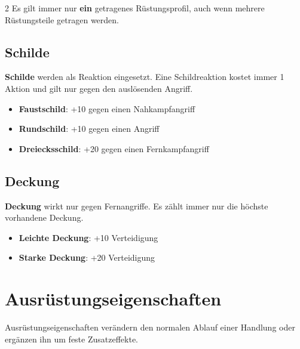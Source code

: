 \begin{multicols*}{2}
Es gilt immer nur \textbf{ein} getragenes Rüstungsprofil, auch wenn mehrere Rüstungsteile getragen werden.

\subsection{Schilde}\label{sec:schilde}

\textbf{Schilde} werden als Reaktion eingesetzt.
Eine Schildreaktion kostet immer 1 Aktion und gilt nur gegen den auslösenden Angriff.

\begin{itemize}[leftmargin=*]
\item \textbf{Faustschild}: +10 gegen einen Nahkampfangriff
\item \textbf{Rundschild}: +10 gegen einen Angriff
\item \textbf{Dreiecksschild}: +20 gegen einen Fernkampfangriff
\end{itemize}

\subsection{Deckung}\label{sec:deckung}

\textbf{Deckung} wirkt nur gegen Fernangriffe.
Es zählt immer nur die höchste vorhandene Deckung.

\begin{itemize}[leftmargin=*]
\item \textbf{Leichte Deckung}: +10 Verteidigung
\item \textbf{Starke Deckung}: +20 Verteidigung
\end{itemize}

\section{Ausrüstungseigenschaften}\label{sec:eigenschaften}

Ausrüstungseigenschaften verändern den normalen Ablauf einer Handlung oder ergänzen ihn um feste Zusatzeffekte.


\end{multicols*}
